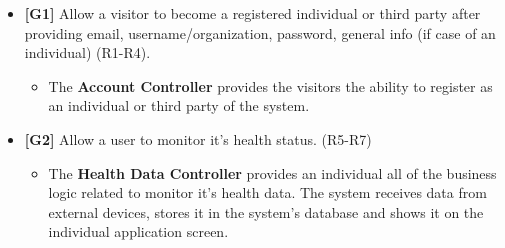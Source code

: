 \documentclass[12pt]{article}
\begin{document}
\begin{itemize}
    \item \textbf{[G1]} Allow a visitor to become a registered individual or third party after providing email, username/organization, password, general info (if case of an individual) (R1-R4). 
\begin{itemize}
    \item The \textbf{Account Controller} provides the visitors the ability to register as an individual or third party of the system.
\end{itemize}

\item \textbf{[G2]} Allow a user to monitor it’s health status. (R5-R7) 
\begin{itemize} 
    \item The \textbf{Health Data Controller} provides an individual all of the business logic related to monitor it's health data. The system receives data from external devices, stores it in the system's database and shows it on the individual application screen.
\end{itemize}


\end{itemize}
\end{document}
